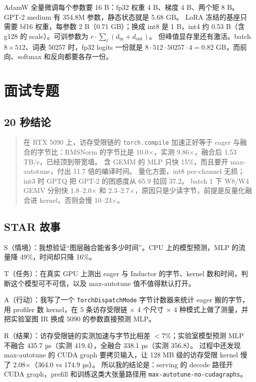 \documentclass[11pt,a4paper]{ctexart}
\begin{document}
AdamW 全量微调每个参数要 16 B：fp32 权重 4 B、梯度 4 B、两个矩 8 B。GPT-2 medium 有 354.8M 参数，静态状态就是 5.68 GB。
LoRA 冻结的基座只需要 bf16 权重，每参数 2 B（0.71 GB）；换成 int8 是 1 B，int4 约 0.53 B（含 g128 的 scale）。可训参数为 $r\cdot\sum_\ell(d_{\text{in}}+d_{\text{out}})$。
但峰值显存里还有激活。batch $8\times512$、词表 50257 时，fp32 logits 一份就是 $8\cdot512\cdot50257\cdot4=0.82$ GB，而前向、softmax 和反向都要各存一份。

\section{面试专题}

\subsection{20 秒结论}

\begin{quote}
在 RTX 5090 上，访存受限链的 \texttt{torch.compile} 加速正好等于 eager 与融合的字节比：RMSNorm 的字节比是 10.0$\times$，实测 9.86$\times$，融合后 1.53 TB/s，已经顶到带宽墙。
含 GEMM 的 MLP 只快 15\%，而且要开 max-autotune，付出 11.7 倍的编译时间。
量化方面，int8 per-channel 无损；int3 时 GPTQ 把 GPT-2 的困惑度从 65.9 拉回 37.2。
batch 1 下 W8/W4 GEMV 分别快 1.8--2.0$\times$ 和 2.3--2.7$\times$，原因只是少读字节，前提是反量化融合进 kernel，否则会慢 10--23$\times$。
\end{quote}

\subsection{STAR 故事}

S（情境）：我想验证“图层融合能省多少时间”。CPU 上的模型预测，MLP 的流量降 49\%，时间却只降 16\%。

T（任务）：在真实 GPU 上测出 eager 与 Inductor 的字节、kernel 数和时间，判断这个模型可不可信，以及 max-autotune 值不值得默认打开。

A（行动）：我写了一个 \texttt{TorchDispatchMode} 字节计数器来统计 eager 搬的字节，用 profiler 数 kernel，在 5 条访存受限链 $\times$ 4 个尺寸 $\times$ 4 种模式上做了测量，并把实验室图 IR 换成 5090 的参数直接预测 MLP。

R（结果）：访存受限链的实测加速与字节比相差 $<$7\%；实验室模型预测 MLP 不融合 435.7 µs（实测 419.4），全融合 338.1 µs（实测 356.8）。
过程中还发现 max-autotune 的 CUDA graph 要拷贝输入，让 128 MB 级的访存受限 kernel 慢了 2.08$\times$（364.0 vs 174.9 µs）。
所以我的结论是：serving 的 decode 路径开 CUDA graph，prefill 和训练这类大张量路径用 \texttt{max-autotune-no-cudagraphs}。
\end{document}
